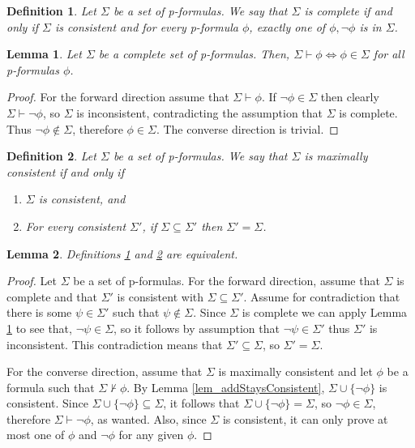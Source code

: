 \documentclass[leqno]{article}
\newtheorem{lemma}{Lemma}[section]
\newtheorem{definition}{Definition}[section]
\newcommand{\set}[1]{\{#1\}}
\newcommand{\proves}{\vdash}
\newcommand{\nproves}{\nvdash}
\begin{document}
\begin{definition} \label{def_propComplete}
    Let $\Sigma$ be a set of p-formulas. We say that $\Sigma$ is complete if and only if $\Sigma$ is consistent and for every p-formula $\phi$, exactly one of $\phi, \neg \phi$ is in $\Sigma$.
\end{definition}

\begin{lemma} \label{lem_simpleComplete}
    Let $\Sigma$ be a complete set of p-formulas. Then, $\Sigma \proves \phi \iff \phi \in \Sigma$ for all p-formulas $\phi$.
\end{lemma}

\begin{proof}
    For the forward direction assume that $\Sigma \proves \phi$. If $\neg \phi \in \Sigma$ then clearly $\Sigma \proves \neg \phi$, so $\Sigma$ is inconsistent, contradicting the assumption that $\Sigma$ is complete. Thus $\neg \phi \notin \Sigma$, therefore $\phi \in \Sigma$.
    The converse direction is trivial.
\end{proof}

\begin{definition} \label{def_propMaxConsistent}
  Let $\Sigma$ be a set of p-formulas. We say that $\Sigma$ is maximally consistent if and only if
  \begin{enumerate}
      \item $\Sigma$ is consistent, and
      \item For every consistent $\Sigma'$, if $\Sigma \subseteq \Sigma'$ then $\Sigma' = \Sigma$.
  \end{enumerate}
\end{definition}

\begin{lemma} \label{lemma_defEquiv}
    Definitions \ref{def_propComplete} and \ref{def_propMaxConsistent} are equivalent.
\end{lemma}

\begin{proof}
     Let $\Sigma$ be a set of p-formulas. For the forward direction, assume that $\Sigma$ is complete and that $\Sigma'$ is consistent with $\Sigma \subseteq \Sigma'$. Assume for contradiction that there is some $\psi \in \Sigma'$ such that $\psi \notin \Sigma$. Since $\Sigma$ is complete we can apply Lemma \ref{lem_simpleComplete} to see that, $\neg \psi \in \Sigma$, so it follows by assumption that $\neg \psi \in \Sigma'$ thus $\Sigma'$ is inconsistent. This contradiction means that $\Sigma' \subseteq \Sigma$, so $\Sigma' = \Sigma$.
     
     For the converse direction, assume that $\Sigma$ is maximally consistent and let $\phi$ be a formula such that $\Sigma \nproves \phi$. By Lemma \ref{lem_addStaysConsistent}, $\Sigma \cup \set{\neg \phi}$ is consistent. Since $\Sigma \cup \set{\neg \phi} \subseteq \Sigma$, it follows that $\Sigma \cup \set{\neg \phi} = \Sigma$, so $\neg \phi \in \Sigma$, therefore $\Sigma \proves \neg \phi$, as wanted. Also, since $\Sigma$ is consistent, it can only prove at most one of $\phi$ and $\neg \phi$ for any given $\phi$.
\end{proof}
\end{document}
